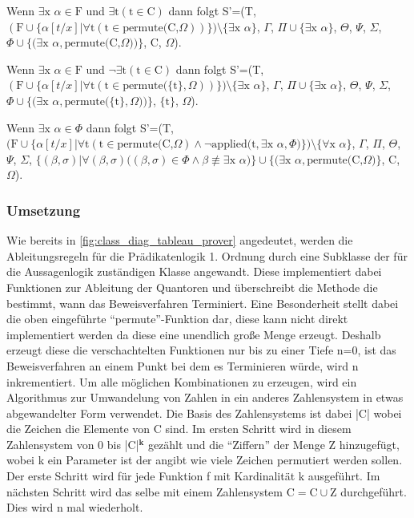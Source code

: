 Wenn $\exists\textrm{x}$ $\alpha\in\textrm{F}$ und $\exists\textrm{t}(\textrm{t}\in\textrm{C})$ dann folgt S'=(T, $(\textrm{F}\cup\lbrace\alpha[t/x]|\forall\textrm{t}(\textrm{t}\in\textrm{permute(C,}\Omega))\rbrace)\setminus\lbrace\exists\textrm{x}$ $\alpha\rbrace$, $\Gamma$, $\Pi\cup\lbrace\exists\textrm{x}$ $\alpha\rbrace$, $\Theta$, $\Psi$, $\Sigma$, $\Phi\cup\lbrace(\exists\textrm{x}$ $\alpha,\textrm{permute(C,}\Omega))\rbrace$, C, $\Omega$).

Wenn $\exists\textrm{x}$ $\alpha\in\textrm{F}$ und $\neg\exists\textrm{t}(\textrm{t}\in\textrm{C})$ dann folgt S'=(T, $(\textrm{F}\cup\lbrace\alpha[t/x]|\forall\textrm{t}(\textrm{t}\in\textrm{permute(}\lbrace\textrm{t}\rbrace,\Omega))\rbrace)\setminus\lbrace\exists\textrm{x}$ $\alpha\rbrace$, $\Gamma$, $\Pi\cup\lbrace\exists\textrm{x}$ $\alpha\rbrace$, $\Theta$, $\Psi$, $\Sigma$, $\Phi\cup\lbrace(\exists\textrm{x}$ $\alpha,\textrm{permute(}\lbrace\textrm{t}\rbrace,\Omega))\rbrace$, $\lbrace\textrm{t}\rbrace$, $\Omega$).

Wenn $\exists\textrm{x}$ $\alpha\in\Phi$ dann folgt S'=(T, $(\textrm{F}\cup\lbrace\alpha[t/x]|\forall\textrm{t}(\textrm{t}\in\textrm{permute(C,}\Omega)\wedge\neg\textrm{applied(t},\exists\textrm{x}$ $\alpha, \Phi)\rbrace)\setminus\lbrace\forall\textrm{x}$ $\alpha\rbrace$, $\Gamma$, $\Pi$, $\Theta$, $\Psi$, $\Sigma$, $\lbrace(\beta,\sigma)|\forall(\beta,\sigma)((\beta,\sigma)\in\Phi\wedge\beta \not\equiv \exists\textrm{x}$ $\alpha)\rbrace\cup\lbrace(\exists\textrm{x}$ $\alpha,\textrm{permute(C,}\Omega)\rbrace$, C, $\Omega$).

\subsubsection{Umsetzung}
Wie bereits in \autoref{fig:class_diag_tableau_prover} angedeutet, werden die Ableitungsregeln für die Prädikatenlogik 1. Ordnung durch eine Subklasse der für die Aussagenlogik zuständigen Klasse angewandt. Diese implementiert dabei Funktionen zur Ableitung der Quantoren und überschreibt die Methode die bestimmt, wann das Beweisverfahren Terminiert. Eine Besonderheit stellt dabei die oben eingeführte ``permute''-Funktion dar, diese kann nicht direkt implementiert werden da diese eine unendlich große Menge erzeugt. Deshalb erzeugt diese die verschachtelten Funktionen nur bis zu einer Tiefe n=0, ist das Beweisverfahren an einem Punkt bei dem es Terminieren würde, wird n inkrementiert. Um alle möglichen Kombinationen zu erzeugen, wird ein Algorithmus zur Umwandelung von Zahlen in ein anderes Zahlensystem in etwas abgewandelter Form verwendet. Die Basis des Zahlensystems ist dabei |C| wobei die Zeichen die Elemente von C sind. Im ersten Schritt wird in diesem Zahlensystem von 0 bis |C|$^{\textbf{k}}$ gezählt und die ``Ziffern'' der Menge Z hinzugefügt, wobei k ein Parameter ist der angibt wie viele Zeichen permutiert werden sollen. Der erste Schritt wird für jede Funktion f mit Kardinalität k ausgeführt. Im nächsten Schritt wird das selbe mit einem Zahlensystem $\textrm{C}=\textrm{C}\cup\textrm{Z}$ durchgeführt. Dies wird n mal wiederholt.

